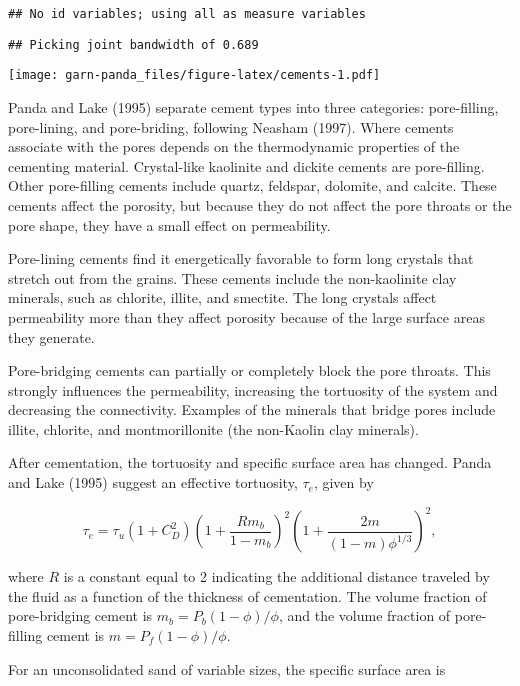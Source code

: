 \documentclass[]{article}
\begin{document}
\begin{verbatim}
## No id variables; using all as measure variables
\end{verbatim}

\begin{verbatim}
## Picking joint bandwidth of 0.689
\end{verbatim}

\texttt{[image: garn-panda\_files/figure-latex/cements-1.pdf]}

Panda and Lake (1995) separate cement types into three categories:
pore-filling, pore-lining, and pore-briding, following Neasham (1997).
Where cements associate with the pores depends on the thermodynamic
properties of the cementing material. Crystal-like kaolinite and dickite
cements are pore-filling. Other pore-filling cements include quartz,
feldspar, dolomite, and calcite. These cements affect the porosity, but
because they do not affect the pore throats or the pore shape, they have
a small effect on permeability.

Pore-lining cements find it energetically favorable to form long
crystals that stretch out from the grains. These cements include the
non-kaolinite clay minerals, such as chlorite, illite, and smectite. The
long crystals affect permeability more than they affect porosity because
of the large surface areas they generate.

Pore-bridging cements can partially or completely block the pore
throats. This strongly influences the permeability, increasing the
tortuosity of the system and decreasing the connectivity. Examples of
the minerals that bridge pores include illite, chlorite, and
montmorillonite (the non-Kaolin clay minerals).

After cementation, the tortuosity and specific surface area has changed.
Panda and Lake (1995) suggest an effective tortuosity, \(\tau_e\), given
by

\begin{equation}
\tau_e = \tau_u \left(1+C_D^2 \right)\left(1+\frac{Rm_b}{1-m_b} \right)^2 \left(1 + \frac{2m}{(1-m) \phi^{1/3}} \right)^2,
\end{equation}

where \(R\) is a constant equal to 2 indicating the additional distance
traveled by the fluid as a function of the thickness of cementation. The
volume fraction of pore-bridging cement is \(m_b = P_b(1-\phi)/\phi\),
and the volume fraction of pore-filling cement is
\(m = P_f (1-\phi)/\phi\).

For an unconsolidated sand of variable sizes, the specific surface area
is
\end{document}
